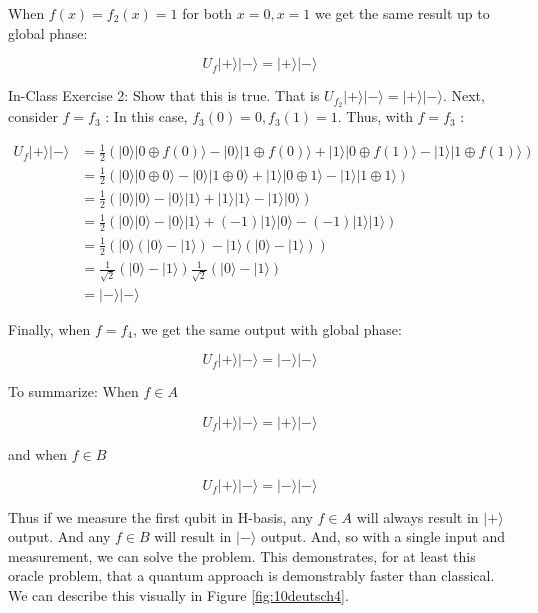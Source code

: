 \documentclass[main.tex]{subfiles}
\begin{document}
    When $f(x)=f_{2}(x)=1$ for both $x=0, x=1$ we get the same result up to global phase:
    
    $$
    U_{f}|+\rangle|-\rangle=|+\rangle|-\rangle
    $$
    
    In-Class Exercise 2: Show that this is true. That is $U_{f_{2}}|+\rangle|-\rangle=|+\rangle|-\rangle$. Next, consider $f=f_{3}$ : In this case, $f_{3}(0)=0, f_{3}(1)=1$. Thus, with $f=f_{3}$ :
    
    $$
    \begin{aligned}
    U_{f}|+\rangle|-\rangle &=\frac{1}{2}(|0\rangle|0 \oplus f(0)\rangle-|0\rangle|1 \oplus f(0)\rangle+|1\rangle|0 \oplus f(1)\rangle-|1\rangle|1 \oplus f(1)\rangle) \\
    &=\frac{1}{2}(|0\rangle|0 \oplus 0\rangle-|0\rangle|1 \oplus 0\rangle+|1\rangle|0 \oplus 1\rangle-|1\rangle|1 \oplus 1\rangle) \\
    &=\frac{1}{2}(|0\rangle|0\rangle-|0\rangle|1\rangle+|1\rangle|1\rangle-|1\rangle|0\rangle) \\
    &=\frac{1}{2}(|0\rangle|0\rangle-|0\rangle|1\rangle+(-1)|1\rangle|0\rangle-(-1)|1\rangle|1\rangle) \\
    &=\frac{1}{2}(|0\rangle(|0\rangle-|1\rangle)-|1\rangle(|0\rangle-|1\rangle)) \\
    &=\frac{1}{\sqrt{2}}(|0\rangle-|1\rangle) \frac{1}{\sqrt{2}}(|0\rangle-|1\rangle) \\
    &=|-\rangle|-\rangle
    \end{aligned}
    $$
    
    Finally, when $f=f_{4}$, we get the same output with global phase:
    
    $$
    U_{f}|+\rangle|-\rangle=|-\rangle|-\rangle
    $$
    
    To summarize: When $f \in A$
    
    $$
    U_{f}|+\rangle|-\rangle=|+\rangle|-\rangle
    $$
    
    and when $f \in B$
    
    $$
    U_{f}|+\rangle|-\rangle=|-\rangle|-\rangle
    $$
    
    Thus if we measure the first qubit in H-basis, any $f \in A$ will always result in $|+\rangle$ output. And any $f \in B$ will result in $|-\rangle$ output. And, so with a single input and measurement, we can solve the problem. This demonstrates, for at least this oracle problem, that a quantum approach is demonstrably faster than classical. We can describe this visually in Figure \ref{fig:10deutsch4}.
    
\end{document}
